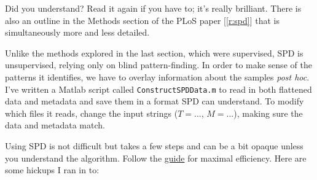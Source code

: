 \documentclass[]{article}
\begin{document}
  Did you understand? Read it again if you have to; it's really brilliant. There is also an outline in the Methods section of the PLoS paper [\ref{r:spd}] that is simultaneously more and less detailed.

  Unlike the methods explored in the last section, which were supervised, SPD is unsupervised, relying only on blind pattern-finding. In order to make sense of the patterns it identifies, we have to overlay information about the samples \textit{post hoc}. I've written a Matlab script called \texttt{ConstructSPDData.m} to read in both flattened data and metadata and save them in a format SPD can understand. To modify which files it reads, change the input strings ($T = ...$, $M = ...$), making sure the data and metadata match.

  Using SPD is not difficult but takes a few steps and can be a bit opaque unless you understand the algorithm. Follow the \href{http://pengqiu.gatech.edu/software/SPD/index.html}{guide} for maximal efficiency. Here are some hickups I ran in to:
\end{document}
